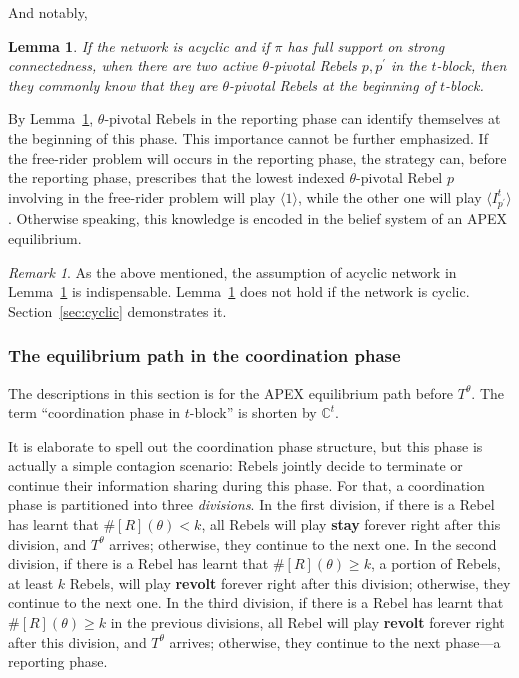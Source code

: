 \documentclass[12pt,letter]{article}
\newcommand{\Kappa}{\mathbb{C}}
\newtheorem{lemma}{Lemma}[section]
\theoremstyle{definition}
\theoremstyle{definition}
\theoremstyle{remark}
\newtheorem*{remark}{Remark}
\theoremstyle{claim}
\begin{document}
And notably,

\begin{lemma}
\label{lemman_pivotals_CK}
If the network is acyclic and if $\pi$ has full support on strong connectedness, when there are two active $\theta$-pivotal Rebels $p,p^{'}$ in the $t$-block, then they commonly know that they are $\theta$-pivotal Rebels at the beginning of $t$-block.
\end{lemma}

By Lemma~\ref{lemman_pivotals_CK}, $\theta$-pivotal Rebels in the reporting phase can identify themselves at the beginning of this phase. This importance cannot be further emphasized. If the free-rider problem will occurs in the reporting phase, the strategy can, before the reporting phase, prescribes that the lowest indexed $\theta$-pivotal Rebel $p$ involving in the free-rider problem will play $\langle 1 \rangle$, while the other one will play $\langle I^t_{p^{'}} \rangle$. Otherwise speaking, this knowledge is encoded in the belief system of an APEX equilibrium. 

\begin{remark}
As the above mentioned, the assumption of acyclic network in Lemma~\ref{lemman_pivotals_CK} is indispensable. Lemma~\ref{lemman_pivotals_CK} does not hold if the network is cyclic. Section~\ref{sec:cyclic} demonstrates it.
\end{remark}






\subsubsection{The equilibrium path in the coordination phase}
\label{sec:eq_cd}
The descriptions in this section is for the APEX equilibrium path {before} $T^{\theta}$. The term ``coordination phase in $t$-block'' is shorten by $\Kappa^{t}$.  

It is elaborate to spell out the coordination phase structure, but this phase is actually a simple contagion scenario: Rebels jointly decide to terminate or continue their information sharing during this phase. For that, a coordination phase is partitioned into three \textit{divisions}. In the first division, if there is a Rebel has learnt that $\#[R](\theta)<k$, all Rebels will play \textbf{stay} forever right after this division, and $T^{\theta}$ arrives; otherwise, they continue to the next one. In the second division, if there is a Rebel has learnt that $\#[R](\theta)\geq k$, a portion of Rebels, at least $k$ Rebels, will play \textbf{revolt} forever right after this division; otherwise, they continue to the next one. In the third division, if there is a Rebel has learnt that $\#[R](\theta)\geq k$ in the previous divisions, all Rebel will play \textbf{revolt} forever right after this division, and $T^{\theta}$ arrives; otherwise, they continue to the next phase---a reporting phase.
\end{document}
